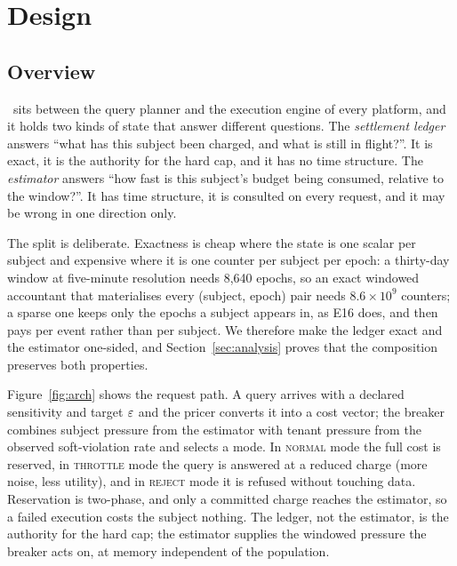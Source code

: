 \section{Design}
\label{sec:design}

\subsection{Overview}
\label{sec:design-overview}

\sys\ sits between the query planner and the execution engine of every platform,
and it holds two kinds of state that answer different questions. The
\emph{settlement ledger} answers ``what has this subject been charged, and what is
still in flight?''. It is exact, it is the authority for the hard cap, and it has no
time structure. The \emph{estimator} answers ``how fast is this subject's budget
being consumed, relative to the window?''. It has time structure, it is consulted on
every request, and it may be wrong in one direction only.

The split is deliberate. Exactness is cheap where the state is one scalar per
subject and expensive where it is one counter per subject per epoch: a thirty-day
window at five-minute resolution needs 8{,}640 epochs, so an exact windowed
accountant that materialises every (subject, epoch) pair needs
$8.6\times10^{9}$ counters; a sparse one keeps only the epochs a subject appears
in, as E16 does, and then pays per event rather than per subject. We therefore
make the ledger exact and the estimator one-sided, and Section~\ref{sec:analysis}
proves that the composition preserves both properties.

Figure~\ref{fig:arch} shows the request path. A query arrives with a declared
sensitivity and target $\varepsilon$ and the pricer converts it into a cost vector; the
breaker combines subject pressure from the estimator with tenant pressure from the
observed soft-violation rate and selects a mode. In \textsc{normal} mode the full cost
is reserved, in \textsc{throttle} mode the query is answered at a reduced charge (more
noise, less utility), and in \textsc{reject} mode it is refused without touching data.
Reservation is two-phase, and only a committed charge reaches the estimator, so a
failed execution costs the subject nothing. The ledger, not the estimator, is the
authority for the hard cap; the estimator supplies the windowed pressure the
breaker acts on, at memory independent of the population.

